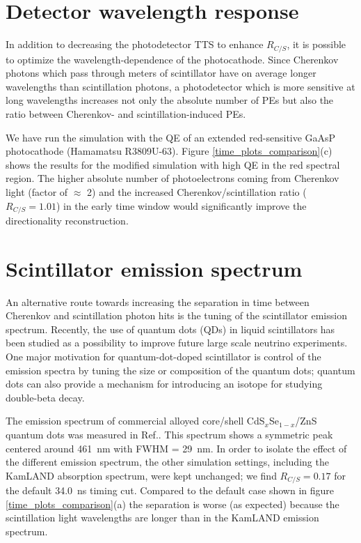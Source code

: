 \documentclass[cits]{JINST}
\begin{document}
\section{Detector wavelength response}
\label{detector_wavelength_response_sec} 
In addition to decreasing the photodetector TTS to enhance $R_{C/S}$,
it is possible to optimize the wavelength-dependence of the
photocathode. Since Cherenkov photons which pass through meters of
scintillator have on average longer wavelengths than scintillation
photons, a photodetector which is more sensitive at long wavelengths
increases not only the absolute number of PEs but also the ratio
between Cherenkov- and scintillation-induced PEs.

We have run the simulation with the QE of an extended red-sensitive
GaAsP photocathode (Hamamatsu R3809U-63)\cite{Hamamatsu_R3899U}.
Figure \ref{time_plots_comparison}(c) shows the results for the
modified simulation with high QE in the red spectral region. The
higher absolute number of photoelectrons coming from Cherenkov light
(factor of $\approx$ 2) and the increased Cherenkov/scintillation
ratio ($R_{C/S}=1.01$) in the early time window would significantly improve the
directionality reconstruction.

\section{Scintillator emission spectrum}
\label{scintillator_emission_sec}
An alternative route towards increasing the separation in time between
Cherenkov and scintillation photon hits is the tuning of the
scintillator emission spectrum. Recently, the use of quantum dots
(QDs) in liquid scintillators has been studied as a possibility to
improve future large scale neutrino experiments\cite{qdot,qdot2}. One
major motivation for quantum-dot-doped scintillator is control of the
emission spectra by tuning the size or composition of the quantum
dots; quantum dots can also provide a mechanism for introducing an 
isotope for studying double-beta decay.  

The emission spectrum of commercial alloyed core/shell
CdS$_x$Se$_{1-x}$/ZnS quantum dots was measured in
Ref.\cite{qdot2}. This spectrum shows a symmetric peak centered
around 461~nm with FWHM = 29~nm.  In order to isolate the effect of
the different emission spectrum, the other simulation settings,
including the KamLAND absorption spectrum, were kept unchanged; we
find $R_{C/S}=0.17$ for the default 34.0~ns timing cut.  Compared to
the default case shown in figure \ref{time_plots_comparison}(a) the
separation is worse (as expected) because the scintillation light
wavelengths are longer than in the KamLAND emission spectrum.
\end{document}
